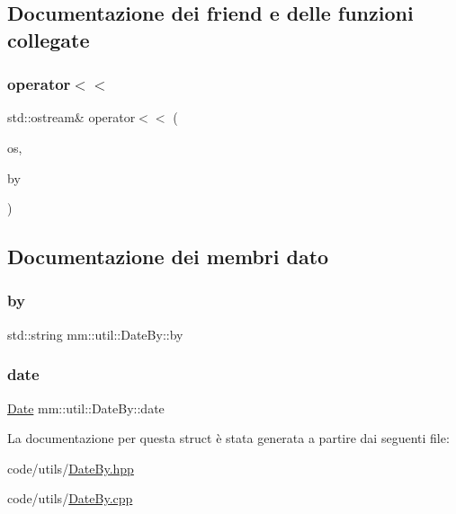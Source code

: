 \subsection{Documentazione dei friend e delle funzioni collegate}
\mbox{\label{structmm_1_1util_1_1_date_by_aee4b77cd66c6fc86b3346dcb9fc9992a}} 
\subsubsection{\texorpdfstring{operator$<$$<$}{operator<<}}
{\footnotesize\ttfamily std\+::ostream\& operator$<$$<$ (\begin{DoxyParamCaption}\item[{std\+::ostream \&}]{os,  }\item[{const \mbox{\hyperlink{structmm_1_1util_1_1_date_by}{Date\+By}} \&}]{by }\end{DoxyParamCaption})\hspace{0.3cm}{\ttfamily [friend]}}



\subsection{Documentazione dei membri dato}
\mbox{\label{structmm_1_1util_1_1_date_by_ae431f5029222a6ec9293c4c4564834f3}} 
\subsubsection{\texorpdfstring{by}{by}}
{\footnotesize\ttfamily std\+::string mm\+::util\+::\+Date\+By\+::by}

\mbox{\label{structmm_1_1util_1_1_date_by_a4adb77c6560794be119e39b374498b68}} 
\subsubsection{\texorpdfstring{date}{date}}
{\footnotesize\ttfamily \mbox{\hyperlink{structmm_1_1util_1_1_date}{Date}} mm\+::util\+::\+Date\+By\+::date}



La documentazione per questa struct è stata generata a partire dai seguenti file\+:\begin{DoxyCompactItemize}
\item 
code/utils/\mbox{\hyperlink{_date_by_8hpp}{Date\+By.\+hpp}}\item 
code/utils/\mbox{\hyperlink{_date_by_8cpp}{Date\+By.\+cpp}}\end{DoxyCompactItemize}
